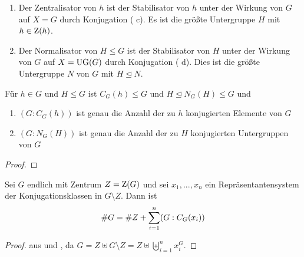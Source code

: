 \begin{remark}
	\begin{enumerate}[label=(\alph*)]
		\item Der Zentralisator von $h$ ist der Stabilisator von $h$ unter der Wirkung von $G$ auf $X=G$ durch Konjugation ( c). Es ist die größte Untergruppe $H$ mit $h\in \operatorname{Z}(h)$.
		\item Der Normalisator von $H\le G$ ist der Stabilisator von $H$ unter der Wirkung von $G$ auf $X=\operatorname{UG}(G)$ durch Konjugation ( d). Dies ist die größte Untergruppe $N$ von $G$ mit $H\unlhd N$.
	\end{enumerate}
\end{remark}

\begin{conclusion}
	Für $h\in G$ und $H\le G$ ist $C_G(h)\le G$ und $H\unlhd N_G(H)\le G$ und 
	\begin{enumerate}[label=(\alph*)]
		\item $(G:C_G(h))$ ist genau die Anzahl der zu $h$ konjugierten Elemente von $G$
		\item $(G:N_G(H))$ ist genau die Anzahl der zu $H$ konjugierten Untergruppen von $G$
	\end{enumerate}
\end{conclusion}
\begin{proof}
\end{proof}

\begin{conclusion}[Klassengleichung]
	Sei $G$ endlich mit Zentrum $Z=\operatorname{Z}(G)$ und sei $x_1,...,x_n$ ein Repräsentantensystem der Konjugationsklassen in $G\setminus Z$. Dann ist
	\begin{align}
		\#G = \#Z + \sum_{i=1}^n (G:C_G(x_i))\notag
	\end{align}
\end{conclusion}
\begin{proof}
	aus  und , da $G=Z\uplus G\setminus Z=Z\uplus\biguplus_{i=1}^n x_i^G$.
\end{proof}